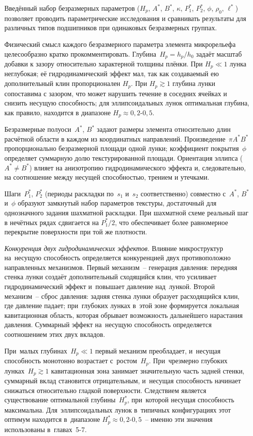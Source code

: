 Введённый набор безразмерных параметров
($H_p$, $A^{*}$, $B^{*}$, $\kappa$, $P_1^{*}$, $P_2^{*}$, $\phi$, $\rho_0$, $\ell^{*}$)
позволяет проводить параметрические исследования и сравнивать результаты
для различных типов подшипников при одинаковых безразмерных группах.

Физический смысл каждого безразмерного параметра элемента
микрорельефа целесообразно кратко прокомментировать.
Глубина~$H_p = h_p/h_0$ задаёт масштаб добавки к зазору
относительно характерной толщины плёнки. При $H_p \ll 1$
лунка неглубокая; её гидродинамический эффект мал, так как
создаваемый ею дополнительный клин пропорционален $H_p$.
При $H_p \gtrsim 1$ глубина лунки сопоставима с зазором,
что может нарушить течение в соседних ячейках и снизить
несущую способность; для эллипсоидальных лунок оптимальная
глубина, как правило, находится в диапазоне
$H_p \approx 0{,}2$-$0{,}5$.

Безразмерные полуоси~$A^{*}$, $B^{*}$ задают размеры элемента
относительно длин расчётной области в каждом из координатных
направлений. Произведение~$\pi A^{*} B^{*}$ пропорционально
безразмерной площади одной лунки; коэффициент
покрытия~$\phi$ определяет суммарную долю текстурированной
площади. Ориентация эллипса ($A^{*} \neq B^{*}$) влияет
на анизотропию гидродинамического эффекта и, следовательно,
на соотношение между несущей способностью, трением и утечками.

Шаги~$P_1^{*}$, $P_2^{*}$ (периоды раскладки по~$s_1$
и~$s_2$ соответственно) совместно с~$A^{*}$, $B^{*}$
и~$\phi$ образуют замкнутый набор параметров текстуры,
достаточный для однозначного задания шахматной раскладки.
При шахматной схеме реальный шаг в нечётных рядах сдвигается
на $P_1^{*}/2$, что обеспечивает более равномерное перекрытие
поверхности при той же плотности.

\textit{Конкуренция двух гидродинамических эффектов.}
Влияние микроструктур на~несущую способность определяется конкуренцией двух противоположно направленных механизмов. Первый механизм~-- генерация давления: передняя стенка лунки создаёт дополнительный сходящийся клин, что усиливает гидродинамический эффект и~повышает давление над~лункой. Второй механизм~-- сброс давления: задняя стенка лунки образует расходящийся клин, где давление падает; при~глубоких лунках в~этой зоне формируется локальная кавитационная область, которая обрывает возможность дальнейшего нарастания давления. Суммарный эффект на~несущую способность определяется соотношением этих двух вкладов.

При~малых глубинах~$H_p \ll 1$ первый механизм преобладает, и~несущая способность монотонно возрастает с~ростом~$H_p$. При~чрезмерно глубоких лунках~$H_p \gtrsim 1$ кавитационная зона занимает значительную часть задней стенки, суммарный вклад становится отрицательным, и~несущая способность начинает снижаться относительно гладкой поверхности. Следствием является существование оптимальной глубины~$H_p^{*}$, при~которой несущая способность максимальна. Для~эллипсоидальных лунок в~типичных конфигурациях этот оптимум находится в~диапазоне $H_p^{*} \approx 0{,}2$-$0{,}5$~-- именно эти значения использованы в~главах~5-7.


